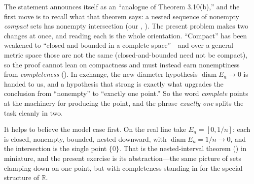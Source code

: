 \documentclass[main.tex]{subfiles}
\begin{document}
\begin{Reflection}
The statement announces itself as an ``analogue of Theorem 3.10(b),'' and the first move is to recall
what that theorem says: a nested sequence of nonempty \emph{compact} sets has nonempty intersection
(our , ). The present problem makes
two changes at once, and reading each is the whole orientation. ``Compact'' has been weakened to
``closed and bounded in a complete space''---and over a general metric space those are not the same
(closed-and-bounded need not be compact), so the proof cannot lean on compactness and must instead earn
nonemptiness from \emph{completeness} (). In exchange, the new diameter hypothesis
$\operatorname{diam} E_n\to 0$ is handed to us, and a hypothesis that strong is exactly what upgrades
the conclusion from ``nonempty'' to ``exactly one point.'' So the word \emph{complete} points at the
machinery for producing the point, and the phrase \emph{exactly one} splits the task cleanly in two.

It helps to believe the model case first. On the real line take $E_n=[0,1/n]$: each is closed,
nonempty, bounded, nested downward, with $\operatorname{diam} E_n=1/n\to 0$, and the intersection is the
single point $\{0\}$. That is the nested-interval theorem () in miniature, and the present
exercise is its abstraction---the same picture of sets clamping down on one point, but with
completeness standing in for the special structure of $\mathbb R$.


\end{Reflection}
\end{document}
